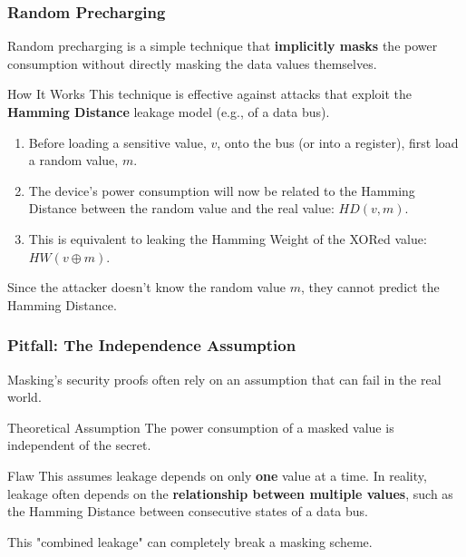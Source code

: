 \begin{frame}
    \frametitle{Random Precharging}

    Random precharging is a simple technique that \textbf{implicitly masks} the power consumption without directly masking the data values themselves.
    
    \begin{block}{How It Works}
        This technique is effective against attacks that exploit the \textbf{Hamming Distance} leakage model (e.g., of a data bus).
        \begin{enumerate}
            \item Before loading a sensitive value, $v$, onto the bus (or into a register), first load a random value, $m$.
            
            \item The device's power consumption will now be related to the Hamming Distance between the random value and the real value: $HD(v, m)$.
            
            \item This is equivalent to leaking the Hamming Weight of the XORed value: $HW(v \oplus m)$.
        \end{enumerate}
    \end{block}
    
    Since the attacker doesn't know the random value $m$, they cannot predict the Hamming Distance.
    
\end{frame}

\begin{frame}
    \frametitle{Pitfall: The Independence Assumption}

    Masking's security proofs often rely on an assumption that can fail in the real world.
    
    \begin{block}{Theoretical Assumption}
        The power consumption of a masked value is independent of the secret.
    \end{block}
    
    \begin{alertblock}{Flaw}
        This assumes leakage depends on only \textbf{one} value at a time. In reality, leakage often depends on the \textbf{relationship between multiple values}, such as the Hamming Distance between consecutive states of a data bus.
    \end{alertblock}
    
    This "combined leakage" can completely break a masking scheme.

\end{frame}

